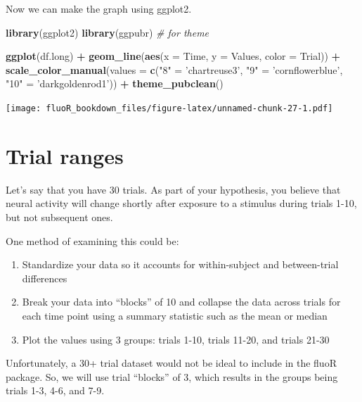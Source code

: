 \documentclass[
]{book}
\newenvironment{Shaded}{\begin{snugshade}}{\end{snugshade}}
\newcommand{\CommentTok}[1]{\textcolor[rgb]{0.56,0.35,0.01}{\textit{#1}}}
\newcommand{\DataTypeTok}[1]{\textcolor[rgb]{0.13,0.29,0.53}{#1}}
\newcommand{\KeywordTok}[1]{\textcolor[rgb]{0.13,0.29,0.53}{\textbf{#1}}}
\newcommand{\NormalTok}[1]{#1}
\newcommand{\OperatorTok}[1]{\textcolor[rgb]{0.81,0.36,0.00}{\textbf{#1}}}
\newcommand{\StringTok}[1]{\textcolor[rgb]{0.31,0.60,0.02}{#1}}
\providecommand{\tightlist}{%
  \setlength{\itemsep}{0pt}\setlength{\parskip}{0pt}}
\begin{document}
Now we can make the graph using ggplot2.

\begin{Shaded}
\begin{Highlighting}[]
\KeywordTok{library}\NormalTok{(ggplot2)}
\KeywordTok{library}\NormalTok{(ggpubr) }\CommentTok{# for theme}

\KeywordTok{ggplot}\NormalTok{(df.long) }\OperatorTok{+}
\StringTok{  }\KeywordTok{geom_line}\NormalTok{(}\KeywordTok{aes}\NormalTok{(}\DataTypeTok{x =}\NormalTok{ Time, }\DataTypeTok{y =}\NormalTok{ Values,}
                \DataTypeTok{color =}\NormalTok{ Trial)) }\OperatorTok{+}
\StringTok{  }\KeywordTok{scale_color_manual}\NormalTok{(}\DataTypeTok{values =} \KeywordTok{c}\NormalTok{(}\StringTok{"8"}\NormalTok{ =}\StringTok{ 'chartreuse3'}\NormalTok{, }
                                \StringTok{"9"}\NormalTok{ =}\StringTok{ 'cornflowerblue'}\NormalTok{, }
                                \StringTok{"10"}\NormalTok{ =}\StringTok{ 'darkgoldenrod1'}\NormalTok{)) }\OperatorTok{+}
\StringTok{  }\KeywordTok{theme_pubclean}\NormalTok{()}
\end{Highlighting}
\end{Shaded}

\texttt{[image: fluoR\_bookdown\_files/figure-latex/unnamed-chunk-27-1.pdf]}

\hypertarget{vis-ranges}{%
\section{Trial ranges}\label{vis-ranges}}

Let's say that you have 30 trials. As part of your hypothesis, you believe that neural activity will change shortly after exposure to a stimulus during trials 1-10, but not subsequent ones.

One method of examining this could be:

\begin{enumerate}
\def\labelenumi{\arabic{enumi}.}
\tightlist
\item
  Standardize your data so it accounts for within-subject and between-trial differences
\item
  Break your data into ``blocks'' of 10 and collapse the data across trials for each time point using a summary statistic such as the mean or median
\item
  Plot the values using 3 groups: trials 1-10, trials 11-20, and trials 21-30
\end{enumerate}

Unfortunately, a 30+ trial dataset would not be ideal to include in the fluoR package. So, we will use trial ``blocks'' of 3, which results in the groups being trials 1-3, 4-6, and 7-9.
\end{document}

